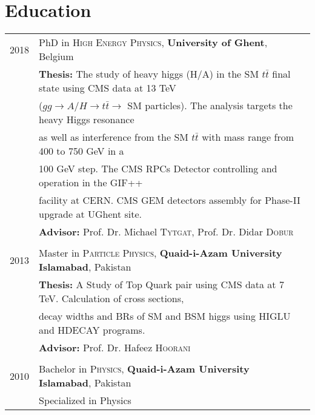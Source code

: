 \documentclass[a4paper,10pt]{article}
\begin{document}
\section{Education}
\begin{tabular}{rl}	
2018 & PhD in \textsc{High Energy Physics}, \small \textbf{University of Ghent}, Belgium\\
&\textbf{Thesis:} \small The study of heavy higgs (H/A) in the SM $t\bar{t}$ final state using CMS data at 13 TeV\\
& ($gg\rightarrow A/H\rightarrow t\bar t \rightarrow$ SM particles). The analysis targets the heavy Higgs resonance \\
& as well as interference from the SM $t\bar t$ with mass range from 400 to 750 GeV in a \\
& 100 GeV step. The CMS RPCs Detector controlling and operation in the GIF++ \\
& facility at CERN. CMS GEM detectors assembly for Phase-II upgrade at UGhent site.\\
& \textbf{Advisor:} Prof. Dr. Michael \textsc{Tytgat}, Prof. Dr. Didar \textsc{Dobur}
\\&\\
2013 & Master in \textsc{Particle Physics}, \small \textbf{Quaid-i-Azam University Islamabad}, Pakistan\\
& \textbf{Thesis:} \small A Study of Top Quark pair using CMS data at 7 TeV. Calculation of cross sections,\\
& decay widths and BRs of SM and BSM higgs using HIGLU and HDECAY programs.\\
&\textbf{Advisor:} Prof. Dr. Hafeez \textsc{Hoorani}
\\&\\
2010 & Bachelor in \textsc{Physics}, \small \textbf{Quaid-i-Azam University Islamabad}, Pakistan\\
& Specialized in Physics\\
\end{tabular}
\end{document}
